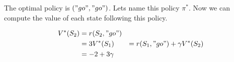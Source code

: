 The optimal policy is $("go","go")$.
Lets name this policy $\pi^*$.
Now we can compute the value of each state following this policy.

\begin{align*}
    V^*(S_2) &= r(S_2, "go") \\
    &= 3
    V^*(S_1) &= r(S_1, "go") + \gamma V^*(S_2) \\
    &= -2 + 3 \gamma
\end{align*}


